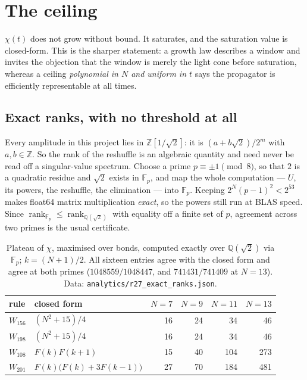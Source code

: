 \documentclass[11pt]{article}
\newcommand{\fn}[1]{\texttt{#1}}
\theoremstyle{plain}
\theoremstyle{remark}
\begin{document}
\section{The ceiling}
\label{sec:ceiling}

$\chi(t)$ does not grow without bound. It saturates, and the saturation value is
closed-form. This is the sharper statement: a growth law describes a window and
invites the objection that the window is merely the light cone before
saturation, whereas a ceiling \emph{polynomial in $N$ and uniform in $t$} says
the propagator is efficiently representable at all times.

\subsection{Exact ranks, with no threshold at all}

Every amplitude in this project lies in $\mathbb Z[1/\sqrt2]$: it is
$(a+b\sqrt2)/2^{m}$ with $a,b\in\mathbb Z$. So the rank of the reshuffle is an
algebraic quantity and need never be read off a singular-value spectrum. Choose
a prime $p\equiv\pm1\pmod 8$, so that $2$ is a quadratic residue and $\sqrt2$
exists in $\mathbb F_p$, and map the whole computation --- $U$, its powers, the
reshuffle, the elimination --- into $\mathbb F_p$. Keeping
$2^{N}(p-1)^2<2^{53}$ makes float64 matrix multiplication \emph{exact}, so the
powers still run at BLAS speed. Since
$\operatorname{rank}_{\mathbb F_p}\le\operatorname{rank}_{\mathbb Q(\sqrt2)}$
with equality off a finite set of $p$, agreement across two primes is the usual
certificate.

\begin{table}[h]
\centering
\begin{tabular}{llrrrr}
\toprule
rule & closed form & $N{=}7$ & $N{=}9$ & $N{=}11$ & $N{=}13$ \\
\midrule
$W_{156}$ & $(N^2+15)/4$ & 16 & 24 & 34 & 46 \\
$W_{198}$ & $(N^2+15)/4$ & 16 & 24 & 34 & 46 \\
$W_{108}$ & $F(k)F(k{+}1)$ & 15 & 40 & 104 & 273 \\
$W_{201}$ & $F(k)\big(F(k){+}3F(k{-}1)\big)$ & 27 & 70 & 184 & 481 \\
\bottomrule
\end{tabular}
\caption{Plateau of $\chi$, maximised over bonds, computed exactly over
$\mathbb Q(\sqrt2)$ via $\mathbb F_p$; $k=(N{+}1)/2$. All sixteen entries agree
with the closed form and agree at both primes ($1048559/1048447$, and
$741431/741409$ at $N{=}13$). Data: \fn{analytics/r27\_exact\_ranks.json}.}
\end{table}
\end{document}
